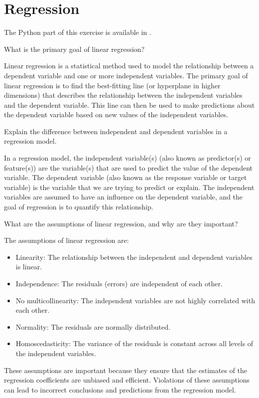 \section{Regression}

The Python part of this exercise is available in .\\

\begin{ejercicio}
    What is the primary goal of linear regression?

    Linear regression is a statistical method used to model the relationship between a dependent variable and one or more independent variables. The primary goal of linear regression is to find the best-fitting line (or hyperplane in higher dimensions) that describes the relationship between the independent variables and the dependent variable. This line can then be used to make predictions about the dependent variable based on new values of the independent variables.
\end{ejercicio}

\begin{ejercicio}
    Explain the difference between independent and dependent variables in a regression model.

    In a regression model, the independent variable(s) (also known as predictor(s) or feature(s)) are the variable(s) that are used to predict the value of the dependent variable. The dependent variable (also known as the response variable or target variable) is the variable that we are trying to predict or explain. The independent variables are assumed to have an influence on the dependent variable, and the goal of regression is to quantify this relationship.
\end{ejercicio}

\begin{ejercicio}
    What are the assumptions of linear regression, and why are they important?

    The assumptions of linear regression are:
    \begin{itemize}
        \item Linearity: The relationship between the independent and dependent variables is linear.
        \item Independence: The residuals (errors) are independent of each other.
        \item No multicollinearity: The independent variables are not highly correlated with each other.
        \item Normality: The residuals are normally distributed.
        \item Homoscedasticity: The variance of the residuals is constant across all levels of the independent variables.
    \end{itemize}
    These assumptions are important because they ensure that the estimates of the regression coefficients are unbiased and efficient. Violations of these assumptions can lead to incorrect conclusions and predictions from the regression model.
\end{ejercicio}

